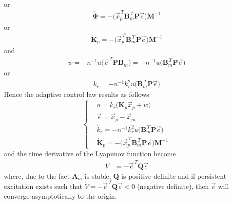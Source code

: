 \documentclass[12pt,a4paper,oneside]{book}
\begin{document}
\begin{onehalfspace}
\begin{equation}
\begin{aligned}
	\end{aligned}
\end{equation}
or
\begin{equation}
	\begin{aligned}
		\dot{\mathbf{\Phi}} = -\Big(\vec{x}_p^{\,T}\mathbf{B}_m^{\,T}\mathbf{P}\vec{e}\Big)\mathbf{M}^{-1}
	\end{aligned}
\end{equation}
or 
\begin{equation}
	\begin{aligned}
		\dot{\mathbf{K}}_p = -\Big(\vec{x}_p^{\,T}\mathbf{B}_m^{\,T}\mathbf{P}\vec{e}\Big)\mathbf{M}^{-1}
	\end{aligned}
\end{equation}
and
\begin{equation}
	\begin{aligned}
		\dot{\psi} = -n^{-1} u \Big(\vec{e}^{\,T}\mathbf{P}\mathbf{B}_m\Big) = -n^{-1} u \Big(\mathbf{B}_m^{\,T}\mathbf{P}\vec{e}\Big)
	\end{aligned}
\end{equation}
or 
\begin{equation}
	\begin{aligned}
		\dot{k}_r = -n^{-1}k_r^2 u \Big(\mathbf{B}_m^{\,T}\mathbf{P}\vec{e}\Big)
	\end{aligned}
\end{equation}
Hence the adaptive control law results as follows 
\begin{equation}
	\left\lbrace \begin{aligned}
		&u = k_r\big(\mathbf{K}_p\vec{x}_p + \dot{w}\big) \\[6pt]
		&\vec{e} = \vec{x}_p-\vec{x}_m \\[6pt]
		&\dot{k}_r = -n^{-1}k_r^2 u \Big(\mathbf{B}_m^{\,T}\mathbf{P}\vec{e}\Big) \\[6pt]
		&\dot{\mathbf{K}}_p = -\Big(\vec{x}_p^{\,T}\mathbf{B}_m^{\,T}\mathbf{P}\vec{e}\Big)\mathbf{M}^{-1}
	\end{aligned}\right. 
\end{equation}
and the time derivative of the Lyapunov function become 
\begin{equation}\label{eq_ctrl_10}
	\begin{aligned}
		\dot{V} &= -\vec{e}^{\,T}\mathbf{Q}\vec{e}
	\end{aligned}
\end{equation}
where, due to the fact $\mathbf{A}_m$ is stable, $\mathbf{Q}$ is positive definite and if persistent excitation exists such that $\dot{V}=-\vec{e}^{\,T}\mathbf{Q}\vec{e}<0$ (negative definite), then $\vec{e}$ will converge asymptotically to the origin.


\end{onehalfspace}
\end{document}
